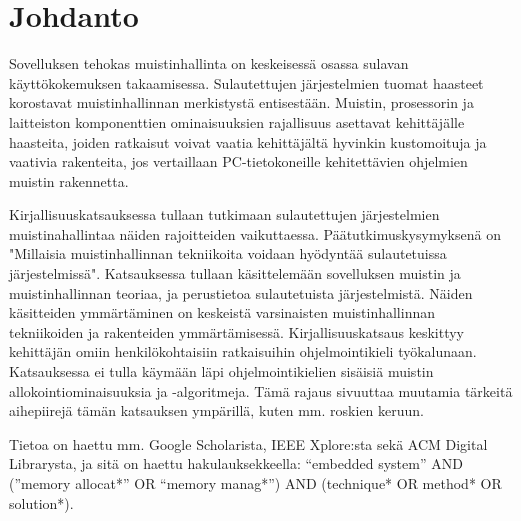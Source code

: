 \chapter{Johdanto} \label{Johdanto}

Sovelluksen tehokas muistinhallinta on keskeisessä osassa sulavan käyttökokemuksen takaamisessa. Sulautettujen järjestelmien tuomat haasteet korostavat muistinhallinnan merkistystä entisestään. Muistin, prosessorin ja laitteiston komponenttien ominaisuuksien rajallisuus asettavat kehittäjälle haasteita, joiden ratkaisut voivat vaatia kehittäjältä hyvinkin kustomoituja ja vaativia rakenteita, jos vertaillaan PC-tietokoneille kehitettävien ohjelmien muistin rakennetta.

Kirjallisuuskatsauksessa tullaan tutkimaan sulautettujen järjestelmien muistinahallintaa näiden rajoitteiden vaikuttaessa. Päätutkimuskysymyksenä on "Millaisia muistinhallinnan tekniikoita voidaan hyödyntää sulautetuissa järjestelmissä". Katsauksessa tullaan käsittelemään sovelluksen muistin ja muistinhallinnan teoriaa, ja perustietoa sulautetuista järjestelmistä. Näiden käsitteiden ymmärtäminen on keskeistä varsinaisten muistinhallinnan tekniikoiden ja rakenteiden ymmärtämisessä. Kirjallisuuskatsaus keskittyy kehittäjän omiin henkilökohtaisiin ratkaisuihin ohjelmointikieli työkalunaan. Katsauksessa ei tulla käymään läpi ohjelmointikielien sisäisiä muistin allokointiominaisuuksia ja -algoritmeja. Tämä rajaus sivuuttaa muutamia tärkeitä aihepiirejä tämän katsauksen ympärillä, kuten mm. roskien keruun.

Tietoa on haettu mm. Google Scholarista, IEEE Xplore:sta sekä ACM Digital Librarysta, ja sitä on haettu hakulauksekkeella: “embedded system” AND (”memory allocat*” OR “memory manag*”) AND (technique* OR method* OR solution*).
